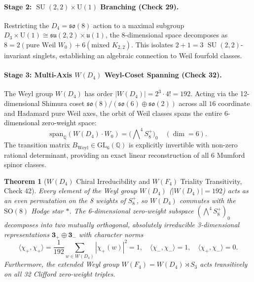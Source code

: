 \documentclass[11pt,a4paper]{article}
\newtheorem{theorem}{Theorem}[section]
\theoremstyle{definition}
\theoremstyle{remark}
\begin{document}
\paragraph{Stage 2: $\operatorname{SU}(2,2) \times \mathrm{U}(1)$ Branching (Check 29).}
Restricting the $D_4 = \mathfrak{so}(8)$ action to a maximal subgroup $D_3 \times \mathrm{U}(1) \cong \mathfrak{su}(2,2) \times \mathfrak{u}(1)$, the 8-dimensional space decomposes as $8 = 2 (\text{pure Weil } W_0) + 6 (\text{mixed } K_{2,2})$. This isolates $2 + 1 = 3$ $\operatorname{SU}(2,2)$-invariant singlets, establishing an algebraic connection to Weil fourfold classes.

\paragraph{Stage 3: Multi-Axis $W(D_4)$ Weyl-Coset Spanning (Check 32).}
The Weyl group $W(D_4)$ has order $|W(D_4)| = 2^3 \cdot 4! = 192$. Acting via the 12-dimensional Shimura coset $\mathfrak{so}(8)/(\mathfrak{so}(6)\oplus\mathfrak{so}(2))$ across all $16$ coordinate and Hadamard pure Weil axes, the orbit of Weil classes spans the entire 6-dimensional zero-weight space:
\begin{equation}
\mathrm{span}_{\mathbb{Q}} \left( W(D_4) \cdot W_0 \right) = \bigl(\bigwedge\nolimits^{\!4} S^+_8\bigr)_0 \quad (\dim = 6).
\end{equation}
The transition matrix $B_{\mathrm{Weyl}} \in \mathrm{GL}_6(\mathbb{Q})$ is explicitly invertible with non-zero rational determinant, providing an exact linear reconstruction of all 6 Mumford spinor classes.

\begin{theorem}[$W(D_4)$ Chiral Irreducibility and $W(F_4)$ Triality Transitivity, Check 42]
\label{thm:weyl_chiral}
Every element of the Weyl group $W(D_4)$ ($|W(D_4)| = 192$) acts as an even permutation on the 8 weights of $S^+_8$, so $W(D_4)$ commutes with the $\mathrm{SO}(8)$ Hodge star $*$. The 6-dimensional zero-weight subspace $(\bigwedge^4 S^+_8)_0$ decomposes into two mutually orthogonal, absolutely irreducible 3-dimensional representations $\mathbf{3}_+ \oplus \mathbf{3}_-$ with character norms
\begin{equation}
\langle \chi_+, \chi_+ \rangle = \frac{1}{192} \sum_{w \in W(D_4)} |\chi_+(w)|^2 = 1, \quad \langle \chi_-, \chi_- \rangle = 1, \quad \langle \chi_+, \chi_- \rangle = 0.
\end{equation}
Furthermore, the extended Weyl group $W(F_4) = W(D_4) \rtimes S_3$ acts transitively on all 32 Clifford zero-weight triples.
\end{theorem}
\end{document}

